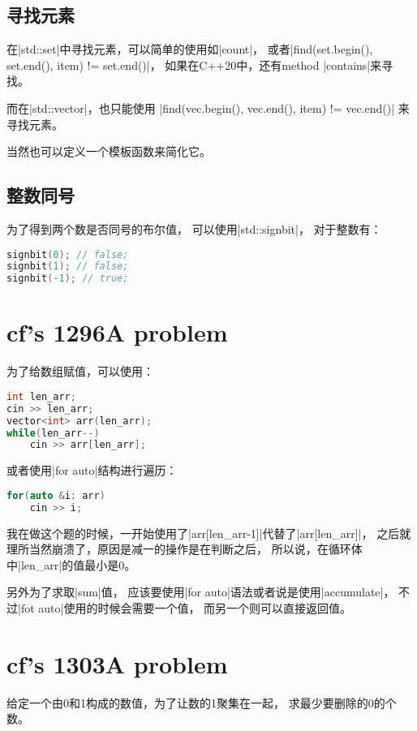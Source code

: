 \subsection{寻找元素}
在\vb|std::set|中寻找元素，可以简单的使用如\vb|count|，
或者\vb|find(set.begin(), set.end(), item) != set.end()|，
如果在C++20中，还有method \vb|contains|来寻找。

而在\vb|std::vector|，也只能使用
\vb|find(vec.begin(), vec.end(), item) != vec.end()|
来寻找元素。

当然也可以定义一个模板函数来简化它。

\subsection{整数同号}
为了得到两个数是否同号的布尔值，
可以使用\vb|std::signbit|，
对于整数有：
\begin{lstlisting}[language=C++]
signbit(0); // false;
signbit(1); // false;
signbit(-1); // true;
\end{lstlisting}



\section{cf's 1296A problem}

为了给数组赋值，可以使用：
\begin{lstlisting}[language=C++]
int len_arr;
cin >> len_arr;
vector<int> arr(len_arr);
while(len_arr--)
    cin >> arr[len_arr];
\end{lstlisting}
或者使用\vb|for auto|结构进行遍历：
\begin{lstlisting}[language=C++]
for(auto &i: arr)
    cin >> i;
\end{lstlisting}

我在做这个题的时候，一开始使用了\vb|arr[len_arr-1]|代替了\vb|arr[len_arr]|，
之后就理所当然崩溃了，原因是减一的操作是在判断之后，
所以说，在循环体中\vb|len_arr|的值最小是0。

另外为了求取\vb|sum|值，
应该要使用\vb|for auto|语法或者说是使用\vb|accumulate|，
不过\vb|fot auto|使用的时候会需要一个值，
而另一个则可以直接返回值。


\section{cf's 1303A problem}

给定一个由0和1构成的数值，为了让数的1聚集在一起，
求最少要删除的0的个数。

